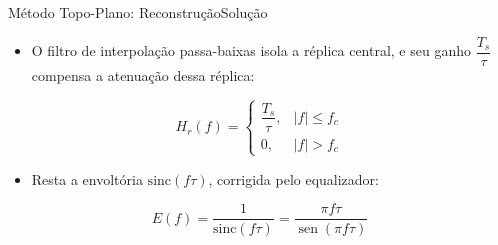 \begin{frame}{Método Topo-Plano: Reconstrução}{Solução}

  \begin{itemize}
    \item O filtro de interpolação passa-baixas isola a réplica central, e seu
          ganho $\dfrac{T_s}{\tau}$ compensa a atenuação dessa réplica:
  \end{itemize}

  \vspace{-0.2em}
  \begin{equation}
    H_r(f) =
    \begin{cases}
      \dfrac{T_s}{\tau}, & |f| \leq f_c \\[6pt]
      0, & |f| > f_c
    \end{cases}
    \label{eq: filtro_reconstrucao_flattop}
  \end{equation}

  \begin{itemize}
    \item Resta a envoltória $\mathrm{sinc}(f\tau)$, corrigida pelo equalizador:
  \end{itemize}

  \vspace{-0.2em}
  \begin{equation}
    E(f) = \frac{1}{\mathrm{sinc}(f\tau)}
         = \frac{\pi f \tau}{\operatorname{sen}(\pi f \tau)}
    \label{eq: equalizador_flattop}
  \end{equation}

\end{frame}


